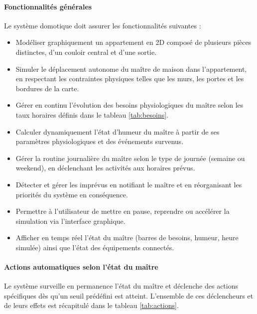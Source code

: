 \paragraph{Fonctionnalités générales} Le système domotique doit assurer les 
fonctionnalités suivantes :
\begin{itemize}
    \item Modéliser graphiquement un appartement en 2D composé de plusieurs pièces 
    distinctes, d'un couloir central et d'une sortie.
    \item Simuler le déplacement autonome du maître de maison dans l'appartement, 
    en respectant les contraintes physiques telles que les murs, les portes et les 
    bordures de la carte.
    \item Gérer en continu l'évolution des besoins physiologiques du maître selon 
    les taux horaires définis dans le tableau \ref{tab:besoins}.
    \item Calculer dynamiquement l'état d'humeur du maître à partir de ses paramètres 
    physiologiques et des événements survenus.
    \item Gérer la routine journalière du maître selon le type de journée (semaine 
    ou weekend), en déclenchant les activités aux horaires prévus.
    \item Détecter et gérer les imprévus en notifiant le maître et en réorganisant 
    les priorités du système en conséquence.
    \item Permettre à l'utilisateur de mettre en pause, reprendre ou accélérer 
    la simulation via l'interface graphique.
    \item Afficher en temps réel l'état du maître (barres de besoins, humeur, 
    heure simulée) ainsi que l'état des équipements connectés.
\end{itemize}

\paragraph{Actions automatiques selon l'état du maître} Le système surveille en 
permanence l'état du maître et déclenche des actions spécifiques dès qu'un seuil 
prédéfini est atteint. L'ensemble de ces déclencheurs et de leurs effets est 
récapitulé dans le tableau \ref{tab:actions}.

